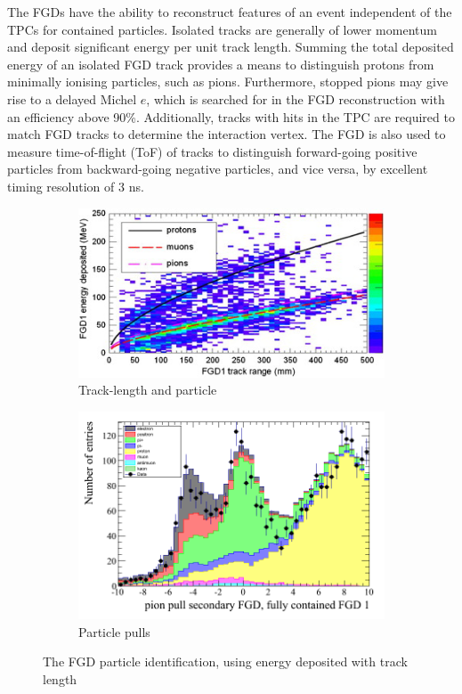 The FGDs have the ability to reconstruct features of an event independent of the TPCs for contained particles. Isolated tracks are generally of lower momentum and deposit significant energy per unit track length. Summing the total deposited energy of an isolated FGD track provides a means to distinguish protons from minimally ionising particles, such as pions. Furthermore, stopped pions may give rise to a delayed Michel $e$, which is searched for in the FGD reconstruction with an efficiency above 90\%\cite{thesis_christine}. Additionally, tracks with hits in the TPC are required to match FGD tracks to determine the interaction vertex. The FGD is also used to measure time-of-flight (ToF) of tracks to distinguish forward-going positive particles from backward-going negative particles, and vice versa, by excellent timing resolution of 3 ns.
\begin{figure}[h]
	\begin{subfigure}[t]{0.47\textwidth}
		\includegraphics[width=\textwidth, trim={0mm 0mm 0mm 0mm}, clip,page=1]{figures/det_chap/fgd/fgd_byrange}
		\caption{Track-length and particle}
	\end{subfigure}
	\begin{subfigure}[t]{0.47\textwidth}
		\includegraphics[width=\textwidth, trim={0mm 0mm 0mm 0mm}, clip,page=1]{figures/numu/Cuts/pull_secondarytrack_FGD_all_fullycontained}
		\caption{Particle pulls}
	\end{subfigure}	
	\caption{The FGD particle identification, using energy deposited with track length}
	\label{fig:fgd_reco}
\end{figure}

